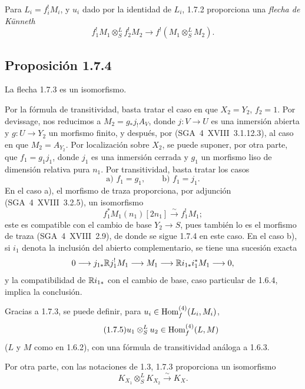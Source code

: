 Para $L_i=f_i^{!}M_i$, y $u_i$ dado por la identidad de $L_i$, 1.7.2 proporciona una \emph{flecha de Künneth}
\begin{equation}\tag{1.7.3}
f_1^{!}M_1\otimes^{L}_{S}f_2^{!}M_2\longrightarrow f^{!}(M_1\otimes^{L}_{S}M_2).
\end{equation}

\subsection*{Proposición 1.7.4}
La flecha 1.7.3 es un isomorfismo.

Por la fórmula de transitividad, basta tratar el caso en que $X_2=Y_2$, $f_2=1$. Por devissage, nos reducimos a $M_2=g_{*}j_{!}A_V$, donde $j:V\to U$ es una inmersión abierta y $g:U\to Y_2$ un morfismo finito, y después, por (SGA~4~XVIII~3.1.12.3), al caso en que $M_2=A_{Y_2}$. Por localización sobre $X_2$, se puede suponer, por otra parte, que $f_1=g_1j_1$, donde $j_1$ es una inmersión cerrada y $g_1$ un morfismo liso de dimensión relativa pura $n_1$. Por transitividad, basta tratar los casos
\[
\text{a) } f_1=g_1,\qquad \text{b) } f_1=j_1.
\]
En el caso a), el morfismo de traza proporciona, por adjunción (SGA~4~XVIII~3.2.5), un isomorfismo
\[
f_1^{*}M_1(n_1)[2n_1]\xrightarrow{\sim}f_1^{!}M_1;
\]
este es compatible con el cambio de base $Y_2\to S$, pues también lo es el morfismo de traza (SGA~4~XVIII~2.9), de donde se sigue 1.7.4 en este caso. En el caso b), si $i_1$ denota la inclusión del abierto complementario, se tiene una sucesión exacta
\[
0\longrightarrow j_{1*}\mathbb{R} j_1^{!}M_1\longrightarrow M_1\longrightarrow \mathbb{R} i_{1*}i_1^{*}M_1\longrightarrow0,
\]
y la compatibilidad de $\mathbb{R} i_{1*}$ con el cambio de base, caso particular de 1.6.4, implica la conclusión.

Gracias a 1.7.3, se puede definir, para $u_i\in\operatorname{Hom}_f^{(4)}(L_i,M_i)$,
\begin{equation}\tag{1.7.5}
u_1\otimes^{L}_{S}u_2\in\operatorname{Hom}_f^{(4)}(L,M)
\end{equation}
($L$ y $M$ como en 1.6.2), con una fórmula de transitividad análoga a 1.6.3.

Por otra parte, con las notaciones de 1.3, 1.7.3 proporciona un isomorfismo
\begin{equation}\tag{1.7.6}
K_{X_1}\otimes^{L}_{S}K_{X_2}\xrightarrow{\sim}K_X.
\end{equation}

